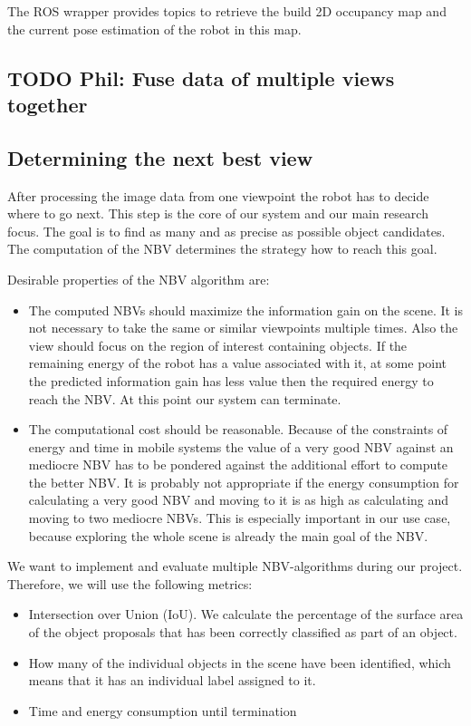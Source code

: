 \documentclass[a4paper,11pt,english]{article}
\begin{document}
The ROS wrapper provides topics to retrieve the build 2D occupancy map and the current pose estimation of the robot in this map.

\subsection{TODO Phil: Fuse data of multiple views together}
\label{system:fusion}

\subsection{Determining the next best view}
\label{system:nbv}
After processing the image data from one viewpoint the robot has to decide where to go next.
This step is the core of our system and our main research focus.
The goal is to find as many and as precise as possible object candidates.
The computation of the NBV determines the strategy how to reach this goal.

Desirable properties of the NBV algorithm are:
\begin{itemize}
	\item The computed NBVs should maximize the information gain on the scene. It is not necessary to take the same or similar viewpoints multiple times. Also the view should focus on the region of interest containing objects. If the remaining energy of the robot has a value associated with it, at some point the predicted information gain has less value then the required energy to reach the NBV. At this point our system can terminate.
	\item The computational cost should be reasonable. Because of the constraints of energy and time in mobile systems the value of a very good NBV against an mediocre NBV has to be pondered against the additional effort to compute the better NBV. It is probably not appropriate if the energy consumption for calculating a very good NBV and moving to it is as high as calculating and moving to two mediocre NBVs. This is especially important in our use case, because exploring the whole scene is already the main goal of the NBV.
\end{itemize}

We want to implement and evaluate multiple NBV-algorithms during our project.
Therefore, we will use the following metrics:
\begin{itemize}
	\item Intersection over Union (IoU). We calculate the percentage of the surface area of the object proposals that has been correctly classified as part of an object.
	\item How many of the individual objects in the scene have been identified, which means that it has an individual label assigned to it.
	\item Time and energy consumption until termination
\end{itemize}
\end{document}
